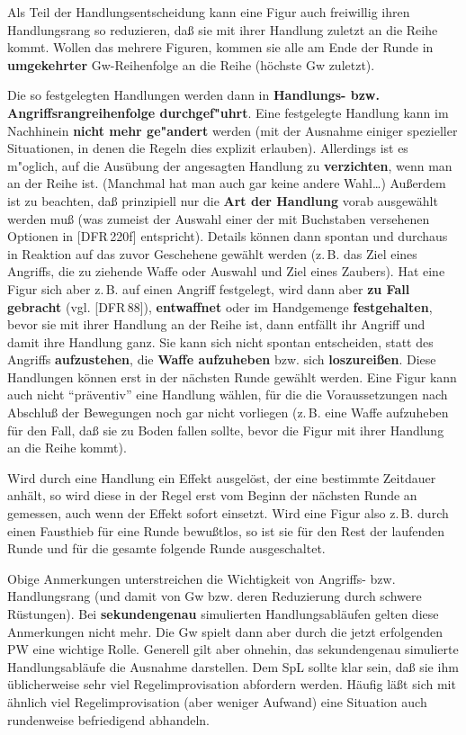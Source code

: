 \documentclass[10pt,a4paper,germanpar]{article}
\begin{document}
Als Teil der Handlungsentscheidung kann eine Figur auch freiwillig
ihren Handlungsrang so reduzieren, daß sie mit ihrer Handlung zuletzt
an die Reihe kommt. Wollen das mehrere Figuren, kommen sie alle am
Ende der Runde in \textbf{umgekehrter} Gw-Reihenfolge an die Reihe
(höchste Gw zuletzt).

Die so festgelegten Handlungen werden dann in \textbf{Handlungs-
  bzw. Angriffsrangreihenfolge durchgef"uhrt}. Eine festgelegte
Handlung kann im Nachhinein \textbf{nicht mehr ge"andert} werden (mit
der Ausnahme einiger spezieller Situationen, in denen die Regeln dies
explizit erlauben). Allerdings ist es m"oglich, auf die Ausübung der
angesagten Handlung zu \textbf{verzichten}, wenn man an der Reihe
ist. (Manchmal hat man auch gar keine andere Wahl\dots) Außerdem ist
zu beachten, daß prinzipiell nur die \textbf{Art der Handlung} vorab
ausgewählt werden muß (was zumeist der Auswahl einer der mit
Buchstaben versehenen Optionen in [DFR\,220f] entspricht). Details
können dann spontan und durchaus in Reaktion auf das zuvor Geschehene
gewählt werden (z.\,B. das Ziel eines Angriffs, die zu ziehende Waffe
oder Auswahl und Ziel eines Zaubers).
Hat eine Figur sich aber z.\,B. auf einen Angriff festgelegt, wird
dann aber \textbf{zu Fall gebracht} (vgl. [DFR\,88]),
\textbf{entwaffnet} oder im Handgemenge \textbf{festgehalten}, bevor
sie mit ihrer Handlung an der Reihe ist, dann entfällt ihr Angriff und
damit ihre Handlung ganz. Sie kann sich nicht spontan entscheiden,
statt des Angriffs \textbf{aufzustehen}, die \textbf{Waffe aufzuheben}
bzw. sich \textbf{loszureißen}. Diese Handlungen können erst in der
nächsten Runde gewählt werden. Eine Figur kann auch nicht
"`präventiv"' eine Handlung wählen, für die die Voraussetzungen nach
Abschluß der Bewegungen noch gar nicht vorliegen (z.\,B. eine Waffe
aufzuheben für den Fall, daß sie zu Boden fallen sollte, bevor die
Figur mit ihrer Handlung an die Reihe kommt).

Wird durch eine Handlung ein Effekt ausgelöst, der eine bestimmte
Zeitdauer anhält, so wird diese in der Regel erst vom Beginn der
nächsten Runde an gemessen, auch wenn der Effekt sofort einsetzt. Wird
eine Figur also z.\,B. durch einen Fausthieb für eine Runde bewußtlos,
so ist sie für den Rest der laufenden Runde und für die gesamte
folgende Runde ausgeschaltet.

Obige Anmerkungen unterstreichen die Wichtigkeit von Angriffs-
bzw. Handlungsrang (und damit von Gw bzw. deren Reduzierung durch
schwere Rüstungen). Bei \textbf{sekundengenau} simulierten
Handlungsabläufen gelten diese Anmerkungen nicht mehr. Die Gw spielt
dann aber durch die jetzt erfolgenden PW eine wichtige Rolle. Generell
gilt aber ohnehin, das sekundengenau simulierte Handlungsabläufe die
Ausnahme darstellen. Dem SpL sollte klar sein, daß sie ihm
üblicherweise sehr viel Regelimprovisation abfordern werden. Häufig
läßt sich mit ähnlich viel Regelimprovisation (aber weniger Aufwand)
eine Situation auch rundenweise befriedigend abhandeln.
\end{document}
